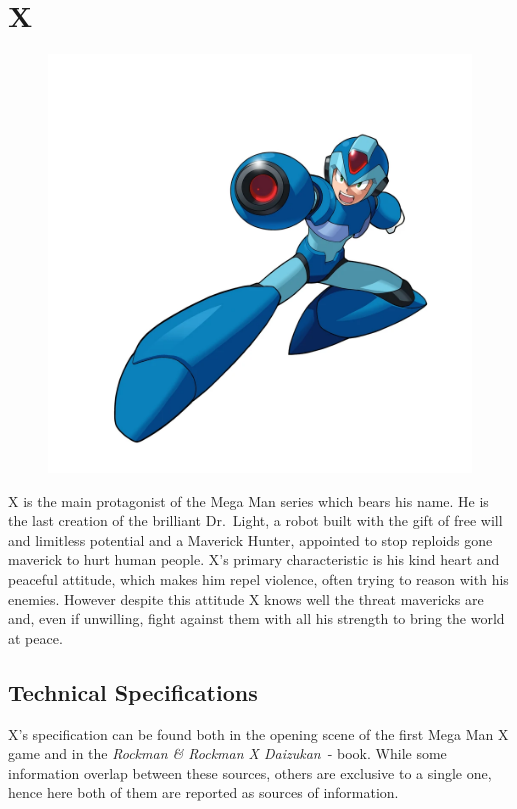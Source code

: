 \chapter{X}\label{char:X}
\begin{figure}[h]
	\centering
	\includegraphics[width=0.6\linewidth]{figures/Characters/Char_MMX.png}
\end{figure}

X is the main protagonist of the Mega Man series which bears his name. He is the last creation of the brilliant Dr.~Light, a robot built with the gift of free will and limitless potential and a Maverick Hunter, appointed to stop reploids gone maverick to hurt human people. 
X's primary characteristic is his kind heart and peaceful attitude, which makes him repel violence, often trying to reason with his enemies. However despite this attitude X knows well the threat mavericks are and, even if unwilling, fight against them with all his strength to bring the world at peace.

\section{Technical Specifications}
X's specification can be found both in the opening scene of the first Mega Man X game and in the \emph{Rockman \& Rockman X Daizukan}~\cite{book:RRXD}-\cite{X_specs_translated} book. While some information overlap between these sources, others are exclusive to a single one, hence here both of them are reported as sources of information.


